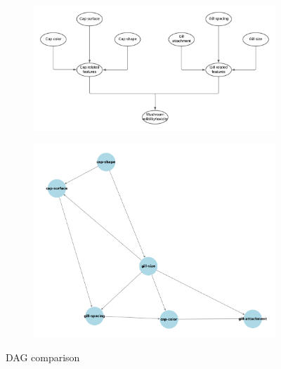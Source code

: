 \documentclass[journal]{IEEEtran}
\begin{document}
\begin{figure}[ht]
\centering
\begin{subfigure}[b]{0.45\textwidth}
\includegraphics[width=\textwidth]{imgs/DAG.png}
\end{subfigure}
\hfill
\begin{subfigure}[b]{0.45\textwidth}
\includegraphics[width=\textwidth]{imgs/betterDAG.png}
\end{subfigure}
\caption{DAG comparison}
\label{fig:DAG comparison}
\end{figure}
\end{document}
